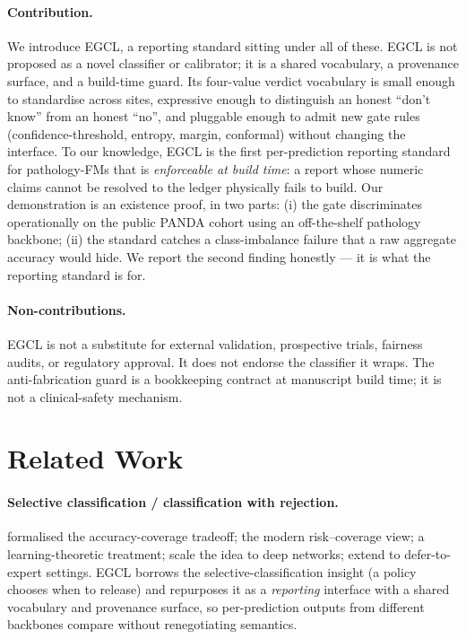 \documentclass{article}
\begin{document}
\paragraph{Contribution.} We introduce EGCL, a reporting standard sitting under all of these. EGCL is not proposed as a novel classifier or calibrator; it is a shared vocabulary, a provenance surface, and a build-time guard. Its four-value verdict vocabulary is small enough to standardise across sites, expressive enough to distinguish an honest ``don't know'' from an honest ``no'', and pluggable enough to admit new gate rules (confidence-threshold, entropy, margin, conformal) without changing the interface. To our knowledge, EGCL is the first per-prediction reporting standard for pathology-FMs that is \emph{enforceable at build time}: a report whose numeric claims cannot be resolved to the ledger physically fails to build. Our demonstration is an existence proof, in two parts: (i) the gate discriminates operationally on the public PANDA cohort using an off-the-shelf pathology backbone; (ii) the standard catches a class-imbalance failure that a raw aggregate accuracy would hide. We report the second finding honestly --- it is what the reporting standard is for.

\paragraph{Non-contributions.} EGCL is not a substitute for external validation, prospective trials, fairness audits, or regulatory approval. It does not endorse the classifier it wraps. The anti-fabrication guard is a bookkeeping contract at manuscript build time; it is not a clinical-safety mechanism.

\section{Related Work}
\label{sec:related}

\paragraph{Selective classification / classification with rejection.} \citet{chow1970} formalised the accuracy-coverage tradeoff; \citet{elyaniv2010selective} the modern risk--coverage view; \citet{cortes2016reject} a learning-theoretic treatment; \citet{geifman2017selective,geifman2019selectivenet} scale the idea to deep networks; \citet{mozannar2020defer} extend to defer-to-expert settings. EGCL borrows the selective-classification insight (a policy chooses when to release) and repurposes it as a \emph{reporting} interface with a shared vocabulary and provenance surface, so per-prediction outputs from different backbones compare without renegotiating semantics.
\end{document}
